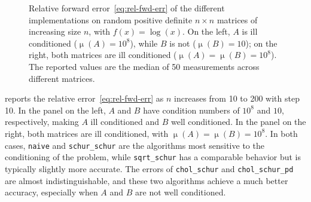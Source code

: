 \documentclass[DIV=14]{scrartcl}
\theoremstyle{thmstyletwo}
\theoremstyle{definition}
\numberwithin{equation}{section}
\DeclareMathOperator{\cond}{\mu}
\newcommand{\algnaive}{\texttt{naive}}
\newcommand{\algss}{\texttt{sqrt\_schur}}
\newcommand{\algsc}{\texttt{chol\_schur}}
\newcommand{\algscp}{\texttt{chol\_schur\_pd}}
\newcommand{\algscsc}{\texttt{schur\_schur}}
\begin{document}
{\begin{figure}
    \caption{Relative forward error~\eqref{eq:rel-fwd-err} of the different implementations on random positive definite $n\times n$ matrices of increasing size $n$, with $f(x)=\log(x)$. On the left, $A$ is ill conditioned ($\cond(A)=10^8$), while $B$ is not ($\cond(B)=10$); on the right, both matrices are ill conditioned ($\cond(A)=\cond(B)=10^8$). The reported values are the median of 50 measurements across different matrices.}
    \label{fig:experiment1}
\end{figure}



 reports the relative error~\eqref{eq:rel-fwd-err} as $n$ increases from 10 to 200 with step 10. In the panel on the left, $A$ and $B$ have condition numbers of $10^8$ and $10$, respectively, making $ A$ ill conditioned and $ B$ well conditioned.  In the panel on the right, both matrices are ill conditioned, with $\cond(A)=\cond(B)=10^8$.
In both cases, \algnaive{} and \algscsc{} are the algorithms most sensitive to the conditioning of the problem, while \algss{} has a comparable behavior but is typically slightly more accurate.
The errors of \algsc{} and \algscp{} are almost indistinguishable, and these two algorithms achieve a much better accuracy, especially when $A$ and $B$ are not well conditioned.

\begin{figure}
    \centering
{}
\end{figure}}
\end{document}
